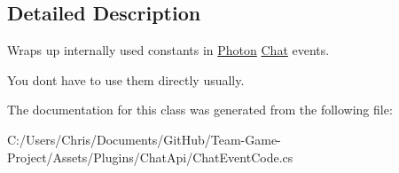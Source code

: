 \subsection{Detailed Description}
Wraps up internally used constants in \hyperlink{namespace_exit_games_1_1_client_1_1_photon}{Photon} \hyperlink{namespace_exit_games_1_1_client_1_1_photon_1_1_chat}{Chat} events. 

You don\textquotesingle{}t have to use them directly usually. 

The documentation for this class was generated from the following file\+:\begin{DoxyCompactItemize}
\item 
C\+:/\+Users/\+Chris/\+Documents/\+Git\+Hub/\+Team-\/\+Game-\/\+Project/\+Assets/\+Plugins/\+Chat\+Api/Chat\+Event\+Code.\+cs\end{DoxyCompactItemize}
